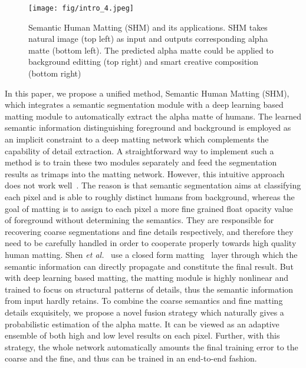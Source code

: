 \begin{figure}
  \centering
\texttt{[image: fig/intro\_4.jpeg]}\\
  \caption{Semantic Human Matting (SHM) and its applications. SHM takes natural image (top left) as input and outputs corresponding alpha matte (bottom left). The predicted alpha matte could be applied to background editting (top right) and smart creative composition (bottom right)}
  \label{human_matting}
\end{figure}




In this paper, we propose a unified method, Semantic Human Matting (SHM), which integrates a semantic segmentation module with a deep learning based matting module to automatically extract the alpha matte of humans.
The learned semantic information distinguishing foreground and background is employed as an implicit constraint
to a deep matting network which complements the capability of detail extraction.
A straightforward way to implement such a method is to train these two modules separately and feed the segmentation results as trimaps into the matting network.
However, this intuitive approach does not work well~\cite{shen2016deep}.
The reason is that 
semantic segmentation aims at classifying each pixel and is able to roughly distinct humans from background, whereas the goal of matting is to assign to each pixel a more fine grained float opacity value of foreground without determining the semantics.
They are responsible for recovering coarse segmentations and fine details respectively, and therefore they need to be carefully handled in order to cooperate properly towards high quality human matting.
Shen \emph{et al.}~\cite{shen2016deep} use a closed form matting~\cite{levin2008closed} layer through which the semantic information can directly propagate and constitute the final result.
But with deep learning based matting, the matting module is highly nonlinear and trained to focus on structural patterns of details, thus the semantic information from input hardly retains.
To combine the coarse semantics and fine matting details exquisitely, we propose a novel fusion strategy which naturally gives a probabilistic estimation of the alpha matte.
It can be viewed as an adaptive ensemble of both high and low level results on each pixel.
Further, with this strategy, the whole network automatically amounts the final training error to the coarse and the fine, and thus can be trained in an end-to-end fashion.








